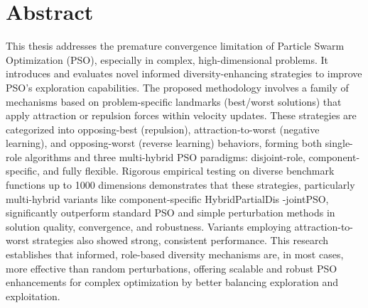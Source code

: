 \thispagestyle{plain}
%
%
%

\chapter*{Abstract}


This thesis addresses the premature convergence limitation of Particle Swarm Optimization (PSO), especially in complex, high-dimensional problems. It introduces and evaluates novel informed diversity-enhancing strategies to improve PSO's exploration capabilities. The proposed methodology involves a family of mechanisms based on problem-specific landmarks (best/worst solutions) that apply attraction or repulsion forces within velocity updates. These strategies are categorized into opposing-best (repulsion), attraction-to-worst (negative learning), and opposing-worst (reverse learning) behaviors, forming both single-role algorithms and three multi-hybrid PSO par\-a\-digms: disjoint-role, component-specific, and fully flexible. Rigorous empirical testing on diverse benchmark functions up to 1000 dimensions demonstrates that these strategies, particularly multi-hybrid variants like component-specific Hy\-brid\-Par\-tial\-Dis
-jointPSO, significantly outperform standard PSO and simple perturbation methods in solution quality, convergence, and robustness. Variants employing attraction-to-worst strategies also showed strong, consistent performance. This research establishes that informed, role-based diversity mechanisms are, in most cases, more effective than random perturbations, offering scalable and robust PSO enhancements for complex optimization by better balancing exploration and exploitation.






\MediaOptionLogicBlank